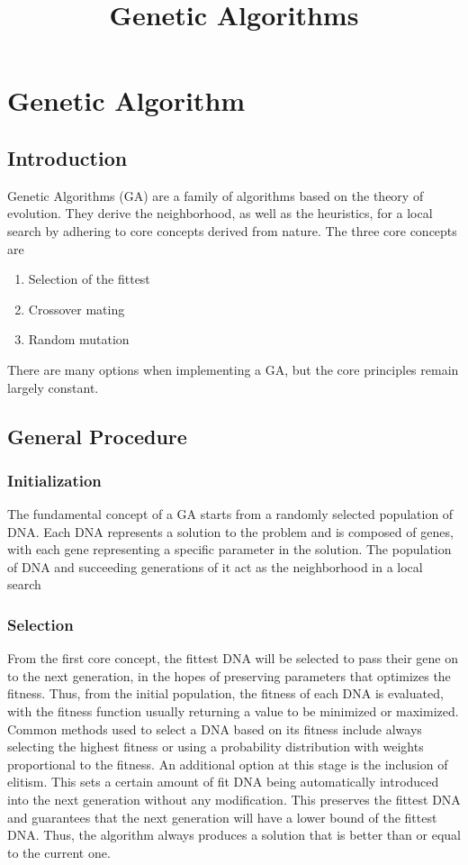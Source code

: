 \documentclass[sigconf]{acmart}
\begin{document}
\title{Genetic Algorithms}
\maketitle
\section{Genetic Algorithm}
\subsection{Introduction}
Genetic Algorithms (GA) are a family of algorithms based on the theory of evolution. They derive the neighborhood, as well as the heuristics, for a local search by adhering to core concepts derived from nature. The three core concepts are
\begin{enumerate}
  \item Selection of the fittest 
  \item Crossover mating
  \item Random mutation
\end{enumerate}
There are many options when implementing a GA, but the core principles remain largely constant.

\subsection{General Procedure}
\subsubsection{Initialization}
The fundamental concept of a GA starts from a randomly selected population of DNA. Each DNA represents a solution to the problem and is composed of genes, with each gene representing a specific parameter in the solution. The population of DNA and succeeding generations of it act as the neighborhood in a local search

\subsubsection{Selection}
From the first core concept, the fittest DNA will be selected to pass their gene on to the next generation, in the hopes of preserving parameters that optimizes the fitness. Thus, from the initial population, the fitness of each DNA is evaluated, with the fitness function usually returning a value to be minimized or maximized. Common methods used to select a DNA based on its fitness include always selecting the highest fitness or using a probability distribution with weights proportional to the fitness.
An additional option at this stage is the inclusion of elitism. This sets a certain amount of fit DNA being automatically introduced into the next generation without any modification. This preserves the fittest DNA and guarantees that the next generation will have a lower bound of the fittest DNA. Thus, the algorithm always produces a solution that is better than or equal to the current one.
\end{document}
